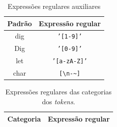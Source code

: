 \begin{table}[!h]
    \centering
    \begin{tabular}{ | c | c |}
        \hline
        Padrão & Expressão regular                         \\
        \hline
        dig    & \texttt{'[1-9]'}                          \\
        Dig    & \texttt{'[0-9]'}                          \\
        let    & \texttt{'[a-zA-Z]'}                       \\
        char   & \texttt{[\textbackslash n-\textasciitilde]} \\
        \hline
    \end{tabular}
    \caption{Expressões regulares auxiliares}
    \label{tab:expressoes-auxiliares}
\end{table}


\begin{center}
    \centering
    \begin{longtable}[c]{ | l | c | }
        \label{tab:expressoes-regulares}
        \caption{Expressões regulares das categorias dos \textit{tokens}.}
        \endfirsthead
        \endhead
        \endfoot
        \endlastfoot
        \hline
        Categoria & Expressão regular\\
        \hline
        
        \hline
    \end{longtable}
\end{center}